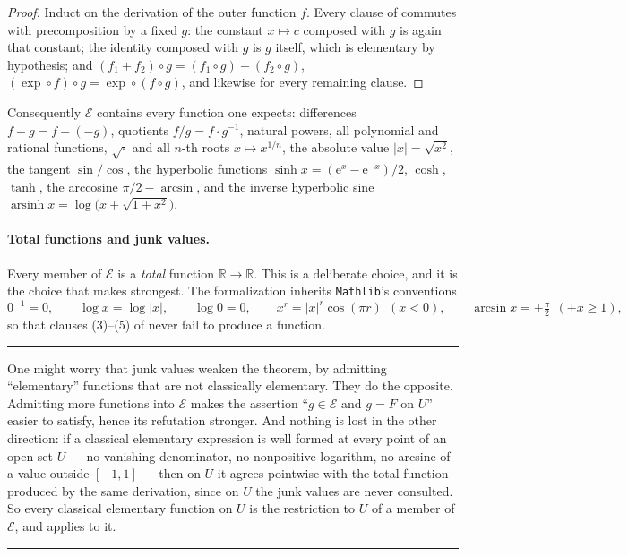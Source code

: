 \documentclass[11pt,oneside]{article}
\theoremstyle{definition}
\theoremstyle{remark}
\newcommand{\R}{\mathbb R}
\newcommand{\e}{\mathrm e}
\newcommand{\Elem}{\mathcal E}
\newenvironment{boxedremark}{%
  \par\smallskip\noindent\begin{center}\begin{minipage}{0.94\textwidth}%
  \color{black}\hrule\vspace{0.6em}\small
}{%
  \vspace{0.6em}\hrule\end{minipage}\end{center}\smallskip
}
\begin{document}
\begin{proof}
Induct on the derivation of the outer function $f$.  Every clause of
 commutes with precomposition by a fixed $g$: the constant
$x\mapsto c$ composed with $g$ is again that constant; the identity composed
with $g$ is $g$ itself, which is elementary by hypothesis; and
$(f_1+f_2)\circ g=(f_1\circ g)+(f_2\circ g)$, $(\exp\circ f)\circ
g=\exp\circ(f\circ g)$, and likewise for every remaining clause.
\end{proof}

Consequently $\Elem$ contains every function one expects: differences
$f-g=f+(-g)$, quotients $f/g=f\cdot g^{-1}$, natural powers, all polynomial
and rational functions, $\sqrt{\cdot}$ and all $n$-th roots $x\mapsto x^{1/n}$,
the absolute value $|x|=\sqrt{x^2}$, the tangent $\sin/\cos$, the hyperbolic
functions $\sinh x=(\e^x-\e^{-x})/2$, $\cosh$, $\tanh$, the arccosine
$\pi/2-\arcsin$, and the inverse hyperbolic sine
$\operatorname{arsinh}x=\log\bigl(x+\sqrt{1+x^2}\bigr)$.

\paragraph{Total functions and junk values.}
Every member of $\Elem$ is a \emph{total} function $\R\to\R$.  This is a
deliberate choice, and it is the choice that makes  strongest.
The formalization inherits \texttt{Mathlib}'s conventions
\[
  0^{-1}=0,\qquad \log x=\log|x|,\qquad \log 0=0,\qquad
  x^{r}=|x|^{r}\cos(\pi r)\ \ (x<0),\qquad
  \arcsin x=\pm\tfrac{\pi}{2}\ \ (\pm x\ge 1),
\]
so that clauses (3)--(5) of  never fail to produce a function.

\begin{boxedremark}
One might worry that junk values weaken the theorem, by admitting
``elementary'' functions that are not classically elementary.  They do the
opposite.  Admitting more functions into $\Elem$ makes the assertion ``$g\in
\Elem$ and $g=F$ on $U$'' easier to satisfy, hence its refutation
stronger.  And nothing is lost in the other direction: if a classical
elementary expression is well formed at every point of an open set $U$ --- no
vanishing denominator, no nonpositive logarithm, no arcsine of a value outside
$[-1,1]$ --- then on $U$ it agrees pointwise with the total function produced
by the same derivation, since on $U$ the junk values are never consulted.
So every classical elementary function on $U$ is the restriction to $U$ of a
member of $\Elem$, and  applies to it.
\end{boxedremark}
\end{document}

